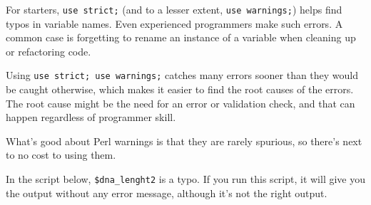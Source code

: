 \documentclass[]{book}
\makeatletter
\newenvironment{Shaded}{\begin{snugshade}}{\end{snugshade}}
\newcommand{\CharTok}[1]{\textcolor[rgb]{0.31,0.60,0.02}{#1}}
\newcommand{\CommentTok}[1]{\textcolor[rgb]{0.56,0.35,0.01}{\textit{#1}}}
\newcommand{\DataTypeTok}[1]{\textcolor[rgb]{0.13,0.29,0.53}{#1}}
\newcommand{\FunctionTok}[1]{\textcolor[rgb]{0.00,0.00,0.00}{#1}}
\newcommand{\KeywordTok}[1]{\textcolor[rgb]{0.13,0.29,0.53}{\textbf{#1}}}
\newcommand{\NormalTok}[1]{#1}
\newcommand{\StringTok}[1]{\textcolor[rgb]{0.31,0.60,0.02}{#1}}
\newenvironment{kframe}{%
\medskip{}
\setlength{\fboxsep}{.8em}
 \def\at@end@of@kframe{}%
 \ifinner\ifhmode%
  \def\at@end@of@kframe{\end{minipage}}%
  \begin{minipage}{\columnwidth}%
 \fi\fi%
 \def\FrameCommand##1{\hskip\@totalleftmargin \hskip-\fboxsep
 \colorbox{shadecolor}{##1}\hskip-\fboxsep
     \hskip-\linewidth \hskip-\@totalleftmargin \hskip\columnwidth}%
 \MakeFramed {\advance\hsize-\width
   \@totalleftmargin\z@ \linewidth\hsize
   \@setminipage}}%
 {\par\unskip\endMakeFramed%
 \at@end@of@kframe}
\renewenvironment{Shaded}{\begin{kframe}}{\end{kframe}}
\makeatother
\begin{document}
For starters, \texttt{use\ strict;} (and to a lesser extent, \texttt{use\ warnings;}) helps find typos in variable names. Even experienced programmers make such errors. A common case is forgetting to rename an instance of a variable when cleaning up or refactoring code.

Using \texttt{use\ strict;\ use\ warnings;} catches many errors sooner than they would be caught otherwise, which makes it easier to find the root causes of the errors. The root cause might be the need for an error or validation check, and that can happen regardless of programmer skill.

What's good about Perl warnings is that they are rarely spurious, so there's next to no cost to using them.

In the script below, \texttt{\$dna\_lenght2} is a typo. If you run this script, it will give you the output without any error message, although it's not the right output.

\begin{Shaded}
\end{Shaded}
\end{document}
